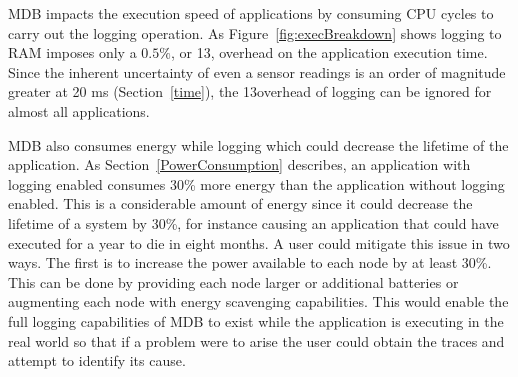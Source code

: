 MDB impacts the execution speed of applications by consuming CPU cycles to carry
out the logging operation. As Figure~\ref{fig:execBreakdown} shows logging to
RAM imposes only a $0.5\%$, or 13\us, overhead on the application execution
time. Since the inherent uncertainty of even a sensor readings is an order of
magnitude greater at 20 ms (Section~\ref{time}), the 13\us overhead of logging
can be ignored for almost all applications.

MDB also consumes energy while logging which could decrease the lifetime of the
application. As Section~\ref{PowerConsumption} describes, an application with
logging enabled consumes 30\% more energy than the application without logging
enabled. This is a considerable amount of energy since it could decrease the
lifetime of a system by 30\%, for instance causing an application that could
have executed for a year to die in eight months. A user could mitigate this
issue in two ways. The first is to increase the power available to each node by
at least 30\%. This can be done by providing each node larger or additional
batteries or augmenting each node with energy scavenging capabilities. This
would enable the full logging capabilities of MDB to exist while the application
is executing in the real world so that if a problem were to arise the user could
obtain the traces and attempt to identify its cause. 

